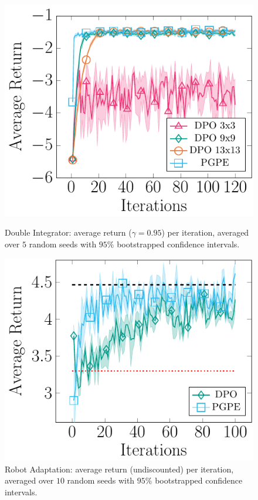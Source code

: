 \begin{figure}[t]
	\begin{minipage}[t]{.48\columnwidth}
		\includegraphics[width=\textwidth]{plots/mass.pdf}
		\caption{Double Integrator: average return ($\gamma=0.95$) per iteration, averaged over $5$ random seeds with $95\%$ bootstrapped confidence intervals.}
		\label{fig:mass}
	\end{minipage}%
	\hfill
	\begin{minipage}[t]{.48\columnwidth}
		\includegraphics[width=\textwidth]{plots/recover.pdf}
		\caption{Robot Adaptation: average return (undiscounted) per iteration, averaged over $10$ random seeds with $95\%$ bootstrapped confidence intervals.}
		\label{fig:recover}
	\end{minipage}
\end{figure}

